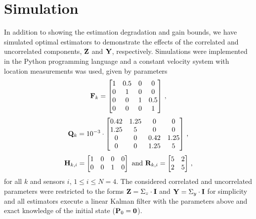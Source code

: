 \documentclass[conference]{IEEEtran}
\theoremstyle{definition}
\theoremstyle{remark}
\begin{document}
\section{Simulation}\label{sec:sim}
In addition to showing the estimation degradation and gain bounds, we have simulated optimal estimators to demonstrate the effects of the correlated and uncorrelated components, ${{\mathbf{Z}}}$ and ${{\mathbf{Y}}}$, respectively. Simulations were implemented in the Python programming language and a constant velocity system with location measurements was used, given by parameters
\begin{equation}
  {\ensuremath{{\mathbf{F}}}}_k=
  \begin{bmatrix}
     1 & 0.5 & 0 & 0\\
     0 & 1 & 0 & 0\\
     0 & 0 & 1 & 0.5\\
     0 & 0 & 0 & 1
  \end{bmatrix}\,,
\end{equation}
\begin{equation}
  {\ensuremath{{\mathbf{Q}}}}_k=10^{-3}\cdot
  \begin{bmatrix}
     0.42 & 1.25 & 0 & 0\\
     1.25 & 5 & 0 & 0\\
     0 & 0 & 0.42 & 1.25\\
     0 & 0 & 1.25 & 5
  \end{bmatrix}\,,
\end{equation}
\begin{equation}
  {\ensuremath{{\mathbf{H}}}}_{k,i}=
  \begin{bmatrix}
     1 & 0 & 0 & 0\\
     0 & 0 & 1 & 0
  \end{bmatrix}
  \text{ and }
  {\ensuremath{{\mathbf{R}}}}_{k,i}=
  \begin{bmatrix}
     5 & 2\\
     2 & 5
  \end{bmatrix}\,,
\end{equation}
for all $k$ and sensors $i$, $1\leq i \leq N=4$. The considered correlated and uncorrelated parameters were restricted to the forms ${{\mathbf{Z}}}=\Sigma_z\cdot{\ensuremath{{\mathbf{I}}}}$ and ${{\mathbf{Y}}}=\Sigma_y\cdot{\ensuremath{{\mathbf{I}}}}$ for simplicity and all estimators execute a linear Kalman filter with the parameters above and exact knowledge of the initial state (${{\mathbf{P}}}_0={{\mathbf{0}}}$).
\end{document}
